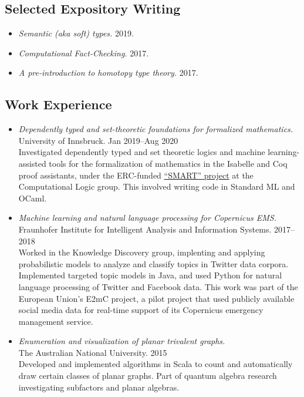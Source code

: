 \documentclass[12pt,a4paper]{article}
\providecommand{\tightlist}{%
  \setlength{\itemsep}{0pt}\setlength{\parskip}{0pt}}
\begin{document}
\subsection{Selected Expository Writing}

\begin{itemize}
\tightlist
\item
  \emph{Semantic (aka soft) types.}
  2019.\hspace{0.5ex}
\item
  \emph{Computational Fact-Checking.}
  2017.\hspace{0.5ex}
\item
  \emph{A pre-introduction to homotopy type theory.}
  2017.\hspace{0.5ex}
\end{itemize}

\subsection{Work Experience}

\begin{itemize}
\item
  \emph{Dependently typed and set-theoretic foundations for formalized mathematics.}\\
  University of Innsbruck.\hfill
  Jan 2019--Aug 2020\\[0.8ex]
  Investigated dependently typed and set theoretic logics and machine learning-assisted tools for the formalization of mathematics in the Isabelle and Coq proof assistants, under the ERC-funded \href{https://project-smart.uibk.ac.at}{``SMART'' project} at the Computational Logic group.
  This involved writing code in Standard ML and OCaml.

\item
  \emph{Machine learning and natural language processing for Copernicus EMS.}\\
  Fraunhofer Institute for Intelligent Analysis and Information Systems.\hfill
  2017--2018\\[0.8ex]
  Worked in the Knowledge Discovery group, implenting and applying probabilistic models to analyze and classify topics in Twitter data corpora.
  Implemented targeted topic models in Java, and used Python for natural language processing of Twitter and Facebook data.
  This work was part of the European Union's E2mC project, a pilot project that used publicly available social media data for real-time support of its Copernicus emergency management service.

\item
  \emph{Enumeration and visualization of planar trivalent graphs.}\\
  The Australian National University.\hfill
  2015\\[0.8ex]
  Developed and implemented algorithms in Scala to count and automatically draw certain classes of planar graphs.
  Part of quantum algebra research investigating subfactors and planar algebras.
\end{itemize}
\end{document}
